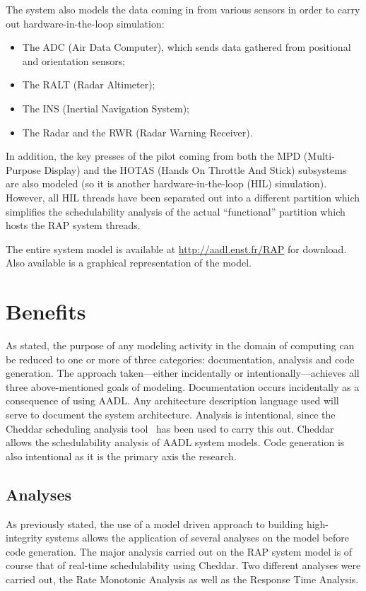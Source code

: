 The system also models the data coming in from various sensors in
order to carry out hardware-in-the-loop simulation:

\begin{itemize}
\item
  The ADC (Air Data Computer), which sends data gathered from
  positional and orientation sensors;

\item
  The RALT (Radar Altimeter);

\item
  The INS (Inertial Navigation System);

\item
  The Radar and the RWR (Radar Warning Receiver).
\end{itemize}

In addition, the key presses of the pilot coming from both the MPD
(Multi-Purpose Display) and the HOTAS (Hands On Throttle And Stick)
subsystems are also modeled (so it is another hardware-in-the-loop
(HIL) simulation). However, all HIL threads have been separated out
into a different partition which simplifies the schedulability
analysis of the actual ``functional'' partition which hosts the RAP
system threads.

The entire \aadl system model is available at
\hbox{\url{http://aadl.enst.fr/RAP}} for download. Also available is a
graphical representation of the model.

\section{Benefits}
\label{benefits}
As stated, the purpose of any modeling activity in the domain of
computing can be reduced to one or more of three categories:
documentation, analysis and code generation. The approach
taken---either incidentally or intentionally---achieves all three
above-mentioned goals of modeling. Documentation occurs incidentally
as a consequence of using AADL. Any architecture description language
used will serve to document the system architecture. Analysis is
intentional, since the Cheddar scheduling analysis
tool~\cite{singhoff@alj04} has been used to carry this out. Cheddar
allows the schedulability analysis of AADL system models. Code
generation is also intentional as it is the primary axis the research.

\subsection{Analyses}
As previously stated, the use of a model driven approach to building
high-integrity systems allows the application of several analyses on
the model before code generation. The major analysis carried out on
the RAP system model is of course that of real-time schedulability using
Cheddar. Two different analyses were carried out, the Rate Monotonic
Analysis as well as the Response Time Analysis.

